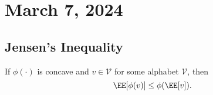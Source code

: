 \section{March 7, 2024}

\subsection{Jensen's Inequality}

\begin{theorem}
\thmlabel

If $\phi(\cdot)$ is concave and $v\in \mathcal{V}$ for some alphabet $\mathcal{V}$, then 
\[\EE[\phi(v)]\leq \phi(\EE[v]).\] 
\end{theorem}
